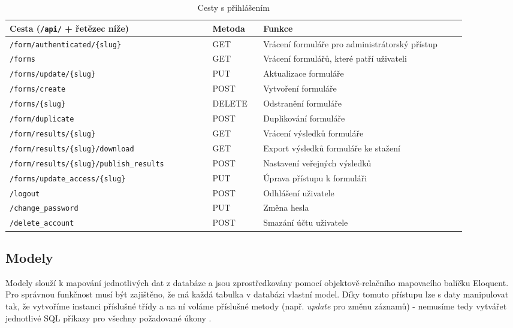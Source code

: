 	\begin{table}[H]
		\centering
		\begin{tabular}{ | p{0.4\linewidth} | p{0.1\linewidth} | p{0.4\linewidth} | } 
			\hline
			\textbf{Cesta (\texttt{/api/} + řetězec níže)} & \textbf{Metoda} & \textbf{Funkce} \\ 
			\hline
			\texttt{/form/authenticated/\{slug\}} & GET & Vrácení formuláře pro administrátorský přístup \\
			\hline
			\texttt{/forms} & GET & Vrácení formulářů, které patří uživateli \\
			\hline
			\texttt{/forms/update/\{slug\}} & PUT & Aktualizace formuláře \\
			\hline
			\texttt{/forms/create} & POST & Vytvoření formuláře \\
			\hline
			\texttt{/forms/\{slug\}} & DELETE & Odstranění formuláře \\
			\hline
			\texttt{/form/duplicate} & POST & Duplikování formuláře \\
			\hline
			\texttt{/form/results/\{slug\}} & GET & Vrácení výsledků formuláře \\
			\hline
			\texttt{/form/results/\{slug\}/download} & GET & Export výsledků formuláře ke stažení \\
			\hline
			\texttt{/form/results/\{slug\}/\newline publish\_results} & POST & Nastavení veřejných výsledků \\
			\hline
			\texttt{/forms/update\_access/\{slug\}} & PUT & Úprava přístupu k formuláři \\
			\hline
			\texttt{/logout} & POST & Odhlášení uživatele \\
			\hline
			\texttt{/change\_password} & PUT & Změna hesla \\
			\hline
			\texttt{/delete\_account} & POST & Smazání účtu uživatele \\
			\hline
		\end{tabular}
		\caption{Cesty s přihlášením}
		\label{tab:cesty_s_prihlasenim}
	\end{table}
	\newpage
	
	\subsection{Modely}
	Modely slouží k mapování jednotlivých dat z databáze a jsou zprostředkovány pomocí objektově-relačního mapovacího balíčku Eloquent. Pro správnou funkčnost musí být zajištěno, že má každá tabulka v databázi vlastní model. Díky tomuto přístupu lze s daty manipulovat tak, že vytvoříme instanci příslušné třídy a na ní voláme příslušné metody (např. \textit{update} pro změnu záznamů) - nemusíme tedy vytvářet jednotlivé SQL příkazy pro všechny požadované úkony \cite{LaravelORM}.
	
